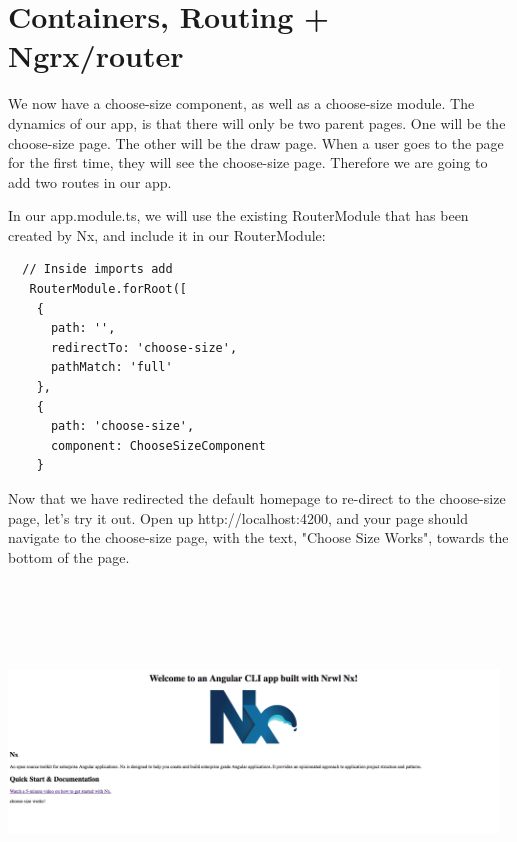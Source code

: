 \maketitle{}
\section{ Containers, Routing + Ngrx/router }

We now have a choose-size component, as well as a choose-size module.
The dynamics of our app, is that there will only be two parent pages. One will
be the choose-size page. The other will be the draw page. When a user goes to
the page for the first time, they will see the choose-size page. Therefore we
are going to add two routes in our app.

In our app.module.ts, we will use the existing RouterModule that has been
created by Nx, and include it in our RouterModule:

\begin{verbatim}
  // Inside imports add
   RouterModule.forRoot([
    {
      path: '',
      redirectTo: 'choose-size',
      pathMatch: 'full'
    },
    {
      path: 'choose-size',
      component: ChooseSizeComponent
    }
\end{verbatim}


Now that we have redirected the default homepage to re-direct to the
choose-size page, let's try it out. Open up http://localhost:4200, and your page
should navigate to the choose-size page, with the text, "Choose Size Works",
towards the bottom of the page.

\includegraphics[width=13cm, height=9cm]{containers-and-routing/choose-size-screenshot}

